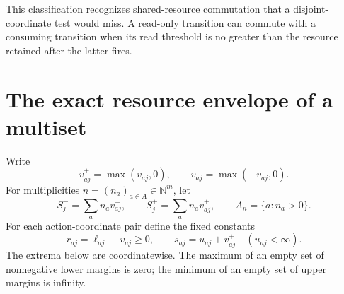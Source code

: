 \documentclass[11pt,a4paper]{article}
\theoremstyle{definition}
\theoremstyle{remark}
\newcommand{\N}{\mathbb N}
\newcommand{\srctag}[1]{\texorpdfstring{\hspace{0.5em}{\normalfont\small\color{accent}[#1]}}{ [#1]}}
\begin{document}
This classification recognizes shared-resource commutation that a disjoint-coordinate test would miss. A read-only transition can commute with a consuming transition when its read threshold is no greater than the resource retained after the latter fires.

\section{The exact resource envelope of a multiset\srctag{01}}\label{cdc:ct:sec:envelope}
Write
\[
 v_{aj}^{+}=\max(v_{aj},0),\qquad v_{aj}^{-}=\max(-v_{aj},0).
\]
For multiplicities $n=(n_a)_{a\in A}\in\N^m$, let
\begin{equation}\label{cdc:ct:eq:loss-gain}
 S_j^- =\sum_a n_a v_{aj}^-,\qquad
 S_j^+ =\sum_a n_a v_{aj}^+,
 \qquad A_n=\{a:n_a>0\}.
\end{equation}
For each action-coordinate pair define the fixed constants
\begin{equation}\label{cdc:ct:eq:retained-cap}
 r_{aj}=\ell_{aj}-v_{aj}^-\ge0,
 \qquad s_{aj}=u_{aj}+v_{aj}^+\quad(u_{aj}<\infty).
\end{equation}
The extrema below are coordinatewise. The maximum of an empty set of nonnegative lower margins is zero; the minimum of an empty set of upper margins is infinity.
\end{document}
